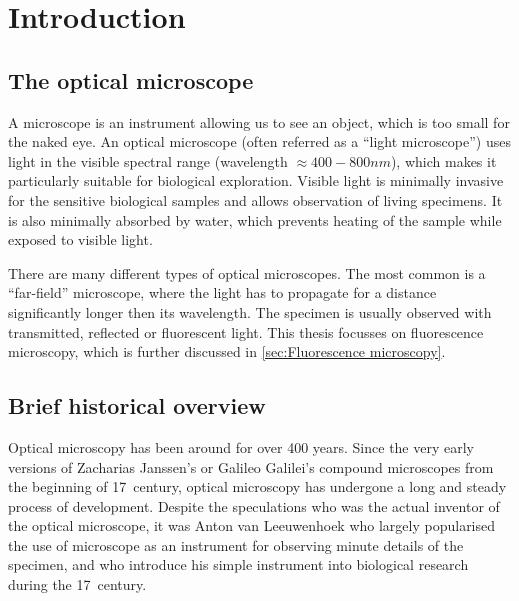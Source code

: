 \chapter{Introduction\label{ch:Introduction}}


\section{The optical microscope}

A microscope is an instrument allowing us to see an object, which is too small for the naked eye. An optical microscope (often referred as a ``light microscope'') uses light in the visible spectral range (wavelength $\approx400-800\unit{nm}$), which makes it particularly suitable for biological exploration. Visible light is minimally invasive for the sensitive biological samples and allows observation of living specimens. It is also minimally absorbed by water, which prevents heating of the sample while exposed to visible light.

There are many different types of optical microscopes. The most common is a ``far-field'' microscope, where the light has to propagate for a distance significantly longer then its wavelength. The specimen is usually observed with transmitted, reflected or fluorescent light. This thesis focusses on fluorescence microscopy, which is further discussed in \autoref{sec:Fluorescence microscopy}.


\section{Brief historical overview}

Optical microscopy has been around for over 400 years. Since the very early versions of Zacharias Janssen's or Galileo Galilei's compound microscopes from the beginning of 17\ths\ century, optical microscopy has undergone a long and steady process of development. Despite the speculations who was the actual inventor of the optical microscope, it was Anton van Leeuwenhoek who largely popularised the use of microscope as an instrument for observing minute details of the specimen, and who introduce his simple instrument into biological research during the 17\ths\ century. 

